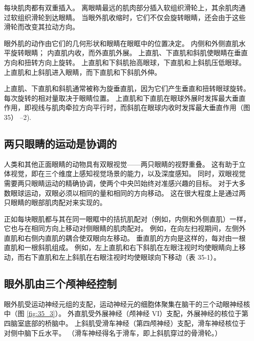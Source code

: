 每块肌肉都有双重插入。 离眼睛最远的肌肉部分插入软组织滑轮上，其余肌肉通过软组织滑轮到达眼睛。 当眼外肌收缩时，它们不仅会旋转眼睛，还会由于这些滑轮而改变其拉动方向。

眼外肌的动作由它们的几何形状和眼睛在眼眶中的位置决定。 内侧和外侧直肌水平旋转眼睛； 内直肌内收，而外直肌外展。 上直肌、下直肌和斜肌使眼睛在垂直方向和扭转方向上旋转。 上直肌和下斜肌抬高眼球，下直肌和上斜肌压低眼球。 上直肌和上斜肌进入眼睛，而下直肌和下斜肌外伸。

上直肌、下直肌和斜肌通常被称为旋垂直肌，因为它们产生垂直和扭转眼球旋转。 每次旋转的相对量取决于眼睛位置。 上直肌和下直肌在眼球外展时发挥最大垂直作用，即视线与肌肉牵拉方向平行时，而斜肌在眼球内收时发挥最大垂直作用（图 35） –2).



\subsection{两只眼睛的运动是协调的}
人类和其他正面眼睛的动物具有双眼视觉——两只眼睛的视野重叠。 这有助于立体视觉，即在三个维度上感知视觉场景的能力，以及深度感知。 同时，双眼视觉需要两只眼睛运动的精确协调，使两个中央凹始终对准感兴趣的目标。 对于大多数眼球运动，双眼必须以相同的量和相同的方向移动。 这在很大程度上是通过两只眼睛的眼部肌肉配对来实现的。

正如每块眼肌都与其在同一眼眶中的拮抗肌配对（例如，内侧和外侧直肌）一样，它也与在相同方向上移动对侧眼睛的肌肉配对。 例如，在向左扫视期间，左侧外直肌和右侧内直肌的耦合使双眼向左移动。 垂直肌的方向是这样的，每对由一根直肌和一根斜肌组成。 例如，左上直肌和右下斜肌在左眼注视时均使眼睛向上移动，而右下直肌和左上斜肌在右眼注视时均使眼球向下移动（表 35-1）。

\subsection{眼外肌由三个颅神经控制}

眼外肌受运动神经元组的支配，运动神经元的细胞体聚集在脑干的三个动眼神经核中（图 \ref{fig:35_3}）。 
外直肌受外展神经（颅神经 VI）支配，外展神经的核位于第四脑室底部的桥脑中。 上斜肌受滑车神经（第四颅神经）支配，滑车神经核位于对侧中脑下丘水平。 （滑车神经得名于滑车，即上斜肌穿过的骨滑轮。）


